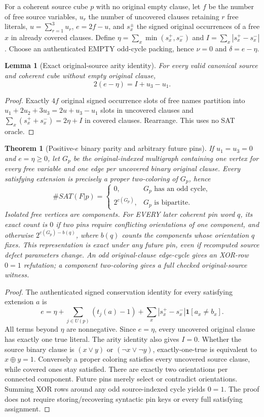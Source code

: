 \documentclass[11pt]{article}
\newtheorem{theorem}{Theorem}
\newtheorem{lemma}{Lemma}
\begin{document}
For a coherent source cube $p$ with no original empty clause, let $f$ be the number of free source variables, $u_r$ the number of uncovered clauses retaining $r$ free literals, $u=\sum_{r=1}^3u_r$, $e=2f-u$, and $s_x^\pm$ the signed original occurrences of a free $x$ in already covered clauses. Define $\eta=\sum_x\min(s_x^+,s_x^-)$ and $I=\sum_x|s_x^+-s_x^-|$. Choose an authenticated EMPTY odd-cycle packing, hence $\nu=0$ and $\delta=e-\eta$.
\begin{lemma}[Exact original-source arity identity]
For every valid canonical source and coherent cube without empty original clause,
\[
\boxed{2(e-\eta)=I+u_3-u_1.}
\]
\end{lemma}
\begin{proof}
Exactly $4f$ original signed occurrence slots of free names partition into $u_1+2u_2+3u_3=2u+u_3-u_1$ slots in uncovered clauses and $\sum_x(s_x^++s_x^-)=2\eta+I$ in covered clauses. Rearrange. This uses no SAT oracle.
\end{proof}
\begin{theorem}[Positive-$e$ binary parity and arbitrary future pins]
If $u_1=u_3=0$ and $e=\eta\ge0$, let $G_p$ be the original-indexed multigraph containing one vertex for every free variable and one edge per uncovered binary original clause. Every satisfying extension is precisely a proper two-coloring of $G_p$, hence
\[
\#SAT(F|p)=
\begin{cases}0,&G_p\text{ has an odd cycle},\\
2^{c(G_p)},&G_p\text{ is bipartite}.\end{cases}
\]
Isolated free vertices are components. For EVERY later coherent pin word $q$, its exact count is $0$ if two pins require conflicting orientations of one component, and otherwise $2^{c(G_p)-b(q)}$, where $b(q)$ counts the components whose orientation $q$ fixes. This representation is exact under any future pin, even if recomputed source defect parameters change. An odd original-clause edge-cycle gives an XOR-row $0=1$ refutation; a component two-coloring gives a full checked original-source witness.
\end{theorem}
\begin{proof}
The authenticated signed conservation identity for every satisfying extension $a$ is
\[
e=\eta+\sum_{j\in U(p)}(t_j(a)-1)
+\sum_x|s_x^+-s_x^-|\mathbf1[a_x\ne b_x].
\]
All terms beyond $\eta$ are nonnegative. Since $e=\eta$, every uncovered original clause has exactly one true literal. The arity identity also gives $I=0$. Whether the source binary clause is $(x\vee y)$ or $(\neg x\vee\neg y)$, exactly-one-true is equivalent to $x\oplus y=1$. Conversely a proper coloring satisfies every uncovered source clause, while covered ones stay satisfied. There are exactly two orientations per connected component. Future pins merely select or contradict orientations. Summing XOR rows around any odd source-indexed cycle yields $0=1$. The proof does not require storing/recovering syntactic pin keys or every full satisfying assignment.
\end{proof}
\end{document}
